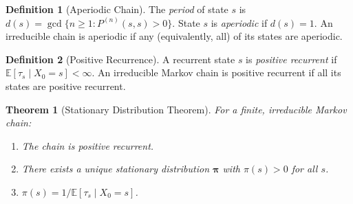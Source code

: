 \documentclass[11pt,a4paper]{article}
\theoremstyle{definition}
\newtheorem{definition}{Definition}[section]
\theoremstyle{plain}
\newtheorem{theorem}{Theorem}[section]
\theoremstyle{remark}
\newcommand{\E}{\mathbb{E}}
\begin{document}
\begin{definition}[Aperiodic Chain]
\label{def:aperiodic}
The \emph{period} of state $s$ is $d(s) = \gcd\{n \geq 1 : P^{(n)}(s, s) > 0\}$. State $s$ is \emph{aperiodic} if $d(s) = 1$. An irreducible chain is aperiodic if any (equivalently, all) of its states are aperiodic.
\end{definition}

\begin{definition}[Positive Recurrence]
\label{def:positive_recurrent}
A recurrent state $s$ is \emph{positive recurrent} if $\E[\tau_s \mid X_0 = s] < \infty$. An irreducible Markov chain is positive recurrent if all its states are positive recurrent.
\end{definition}

\begin{keyresult}
\begin{theorem}[Stationary Distribution Theorem]
\label{thm:stationary_existence}
For a finite, irreducible Markov chain:
\begin{enumerate}[nosep]
    \item The chain is positive recurrent.
    \item There exists a unique stationary distribution $\boldsymbol{\pi}$ with $\pi(s) > 0$ for all $s$.
    \item $\pi(s) = 1 / \E[\tau_s \mid X_0 = s]$.
\end{enumerate}
\end{theorem}
\end{keyresult}
\end{document}
